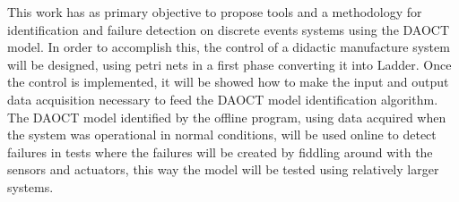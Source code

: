 \begin{foreignabstract}

This work has as primary objective to propose tools and a methodology
for identification and failure detection on discrete events systems
using the \gls{DAOCT} model. In order to accomplish this, the control
of a didactic manufacture system will be designed, using petri nets in
a first phase converting it into Ladder. Once the control is
implemented, it will be showed how to make the input and output data
acquisition necessary to feed the \gls{DAOCT} model identification
algorithm. The \gls{DAOCT} model identified by the offline program,
using data acquired when the system was operational in normal
conditions, will be used online to detect failures in tests where the
failures will be created by fiddling around with the sensors and
actuators, this way the model will be tested using relatively larger systems.



\end{foreignabstract}

